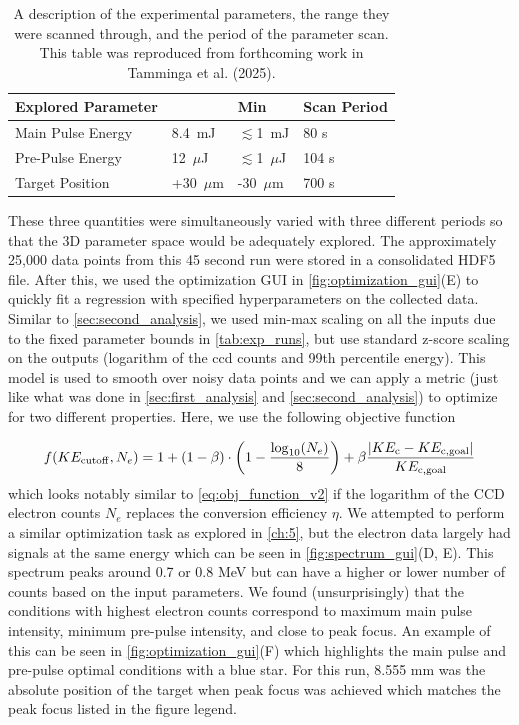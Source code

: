 \begin{table}
	\centering
	\begin{tabular}{|p{4cm}|p{1.5cm}|p{1.5cm}|p{3cm}|}
		\hline
		\textbf{Explored Parameter} & \text{Max} & \textbf{Min} & \textbf{Scan Period}\\
		\hline
		Main Pulse Energy & 8.4~mJ & $\lesssim$1~mJ & 80 s\\
		\hline
		Pre-Pulse Energy & 12~$\mu$J & $\lesssim$1~$\mu$J & 104 s\\
		\hline
		Target Position & +30~$\mu$m & -30~$\mu$m & 700 s\\
		\hline
	\end{tabular}
	\caption{A description of the experimental parameters, the range they were scanned through, and the period of the parameter scan. This table was reproduced from forthcoming work in Tamminga et al. (2025).}
	\label{tab:exp_runs}
\end{table}

These three quantities were simultaneously varied with three different periods so that the 3D parameter space would be adequately explored. The approximately 25,000 data points from this 45 second run were stored in a consolidated \gls{HDF5} file. After this, we used the optimization \gls{GUI} in \autoref{fig:optimization_gui}(E) to quickly fit a regression with specified hyperparameters on the collected data. Similar to \autoref{sec:second_analysis}, we used min-max scaling on all the inputs due to the fixed parameter bounds in \autoref{tab:exp_runs}, but use standard z-score scaling on the outputs (logarithm of the ccd counts and 99th percentile energy). This model is used to smooth over noisy data points and we can apply a metric (just like what was done in \autoref{sec:first_analysis} and \autoref{sec:second_analysis}) to optimize for two different properties. Here, we use the following objective function

\begin{equation}
	f(KE_{\rm cutoff},N_{e})  =  1 + (1 - \beta) \cdot \left(1 -  \frac{\log_{10}(N_{e})}{8} \right) + \beta \frac{|KE_{\rm c} - KE_{\rm c,goal}|}{KE_{\rm c, goal}} \label{eq:obj_function_daq}
\end{equation}
which looks notably similar to \autoref{eq:obj_function_v2} if the logarithm of the \gls{CCD} electron counts $N_e$ replaces the conversion efficiency $\eta$. We attempted to perform a similar optimization task as explored in \autoref{ch:5}, but the electron data largely had signals at the same energy which can be seen in \autoref{fig:spectrum_gui}(D, E). This spectrum peaks around 0.7 or 0.8 MeV but can have a higher or lower number of counts based on the input parameters. We found (unsurprisingly) that the conditions with highest electron counts correspond to maximum main pulse intensity, minimum pre-pulse intensity, and close to peak focus. An example of this can be seen in \autoref{fig:optimization_gui}(F) which highlights the main pulse and pre-pulse optimal conditions with a blue star. For this run, 8.555 mm was the absolute position of the target when peak focus was achieved which matches the peak focus listed in the figure legend.

